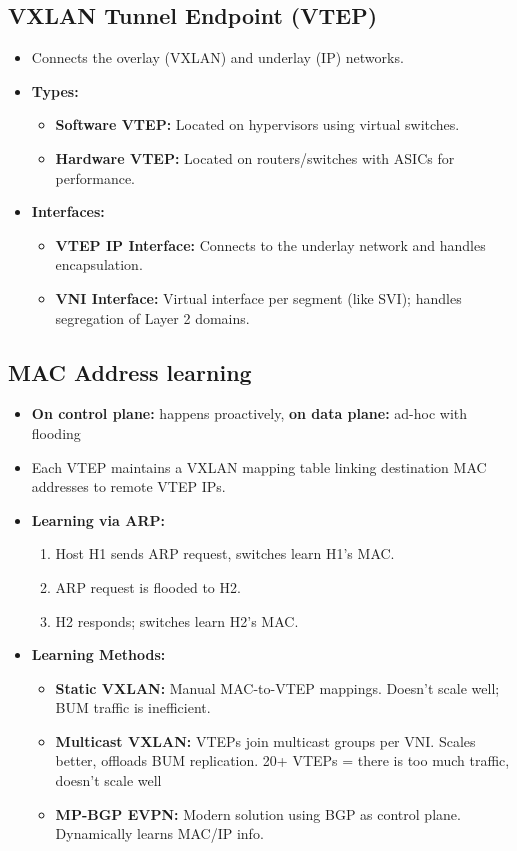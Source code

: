 \begin{multicols*}{5}
		\subsection{VXLAN Tunnel Endpoint (VTEP)}
		\begin{itemize}
			\item Connects the overlay (VXLAN) and underlay (IP) networks.
			\item \textbf{Types:}
			\begin{itemize}
				\item \textbf{Software VTEP:} Located on hypervisors using virtual switches.
				\item \textbf{Hardware VTEP:} Located on routers/switches with ASICs for performance.
			\end{itemize}
			\item \textbf{Interfaces:}
			\begin{itemize}
				\item \textbf{VTEP IP Interface:} Connects to the underlay network and handles encapsulation.
				\item \textbf{VNI Interface:} Virtual interface per segment (like SVI); handles segregation of Layer 2 domains.
			\end{itemize}
		\end{itemize}
		
		\subsection{MAC Address learning}
		\begin{itemize}
			\item \textbf{On control plane:} happens proactively, \textbf{on data plane:} ad-hoc with flooding
			\item Each VTEP maintains a VXLAN mapping table linking destination MAC addresses to remote VTEP IPs.
			\item \textbf{Learning via ARP:}
			\begin{enumerate}
				\item Host H1 sends ARP request, switches learn H1's MAC.
				\item ARP request is flooded to H2.
				\item H2 responds; switches learn H2's MAC.
			\end{enumerate}
			\item \textbf{Learning Methods:}
			\begin{itemize}
				\item \textbf{Static VXLAN:} Manual MAC-to-VTEP mappings. Doesn’t scale well; BUM traffic is inefficient.
				\item \textbf{Multicast VXLAN:} VTEPs join multicast groups per VNI. Scales better, offloads BUM replication. 20+ VTEPs = there is too much traffic, doesn't scale well
				\item \textbf{MP-BGP EVPN:} Modern solution using BGP as control plane. Dynamically learns MAC/IP info.
			\end{itemize}
		\end{itemize}
		

\end{multicols*}
